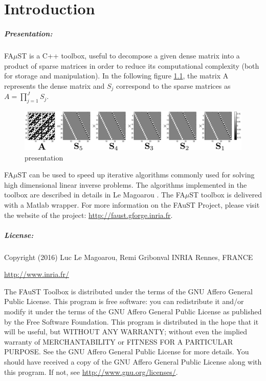 \chapter{Introduction}\label{sec:intro}

\paragraph{Presentation:}FA$\mu$ST is a C++ toolbox, useful to decompose a given dense matrix into a product of sparse matrices in order to reduce its computational complexity (both for storage and manipulation). In the following figure \ref{fig:presentation}, the matrix A represents the dense matrix and $S_j$ correspond to the sparse matrices as $A=\prod_{j=1}^J S_j$.

\begin{figure}[!h] %
\centering
\includegraphics[scale=0.5]{images/hadamard32_bw.pdf}
\caption{presentation}
\label{fig:presentation}
\end{figure}

FA$\mu$ST can be used to speed up iterative algorithms commonly used for solving high dimensional linear inverse problems. The algorithms implemented in the toolbox are described in details in Le Magoarou \cite{LeMagoarou2016}.
The FA$\mu$ST toolbox is delivered with a Matlab wrapper. 
For more information on the FAuST Project, please visit the website of the project: \url{http://faust.gforge.inria.fr}.



\paragraph{License:}Copyright (2016) Luc Le Magoarou, Remi Gribonval INRIA Rennes, FRANCE 
\begin{center} 
\url{http://www.inria.fr/}
\end{center}
The FAuST Toolbox is distributed under the terms of the GNU Affero General Public License. This program is free software: you can redistribute it and/or modify it under the terms of the GNU Affero General Public License as published by the Free Software Foundation. This program is distributed in the hope that it will be useful, but WITHOUT ANY WARRANTY; without even the implied warranty of MERCHANTABILITY or FITNESS FOR A PARTICULAR PURPOSE.  See the GNU Affero General Public License for more details. You should have received a copy of the GNU Affero General Public License along with this program.  If not, see \url{http://www.gnu.org/licenses/}.


